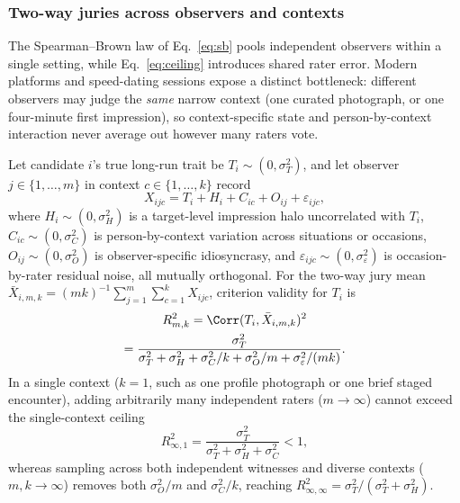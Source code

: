 \subsubsection{Two-way juries across observers and contexts}\label{sec:twoway}
The Spearman--Brown law of Eq.~\eqref{eq:sb} pools independent observers within a single setting, while
Eq.~\eqref{eq:ceiling} introduces shared rater error. Modern platforms and speed-dating sessions expose a distinct bottleneck:
different observers may judge the \emph{same} narrow context (one curated photograph, or one four-minute first impression),
so context-specific state and person-by-context interaction never average out however many raters vote.

\begin{proposition}\label{prop:twoway}
Let candidate $i$'s true long-run trait be $T_i\sim(0,\sigma_T^2)$, and let observer $j\in\{1,\dots,m\}$ in context
$c\in\{1,\dots,k\}$ record
\begin{equation}
X_{ijc}=T_i+H_i+C_{ic}+O_{ij}+\varepsilon_{ijc},\label{eq:twowaymodel}
\end{equation}
where $H_i\sim(0,\sigma_H^2)$ is a target-level impression halo uncorrelated with $T_i$, $C_{ic}\sim(0,\sigma_C^2)$ is
person-by-context variation across situations or occasions, $O_{ij}\sim(0,\sigma_O^2)$ is observer-specific idiosyncrasy,
and $\varepsilon_{ijc}\sim(0,\sigma_\varepsilon^2)$ is occasion-by-rater residual noise, all mutually orthogonal. For the
two-way jury mean $\bar X_{i,m,k}=(mk)^{-1}\sum_{j=1}^{m}\sum_{c=1}^{k}X_{ijc}$, criterion validity for $T_i$ is
\begin{multline}
R^2_{m,k}=\Corr(T_i,\bar X_{i,m,k})^2\\
=\frac{\sigma_T^2}{\sigma_T^2+\sigma_H^2+\sigma_C^2/k+\sigma_O^2/m+\sigma_\varepsilon^2/(mk)}.\label{eq:twoway}
\end{multline}
In a single context ($k=1$, such as one profile photograph or one brief staged encounter), adding arbitrarily many
independent raters ($m\to\infty$) cannot exceed the single-context ceiling
\begin{equation}
R^2_{\infty,1}=\frac{\sigma_T^2}{\sigma_T^2+\sigma_H^2+\sigma_C^2}<1,\label{eq:twowayceil}
\end{equation}
whereas sampling across both independent witnesses and diverse contexts ($m,k\to\infty$) removes both $\sigma_O^2/m$ and
$\sigma_C^2/k$, reaching $R^2_{\infty,\infty}=\sigma_T^2/(\sigma_T^2+\sigma_H^2)$.
\end{proposition}

